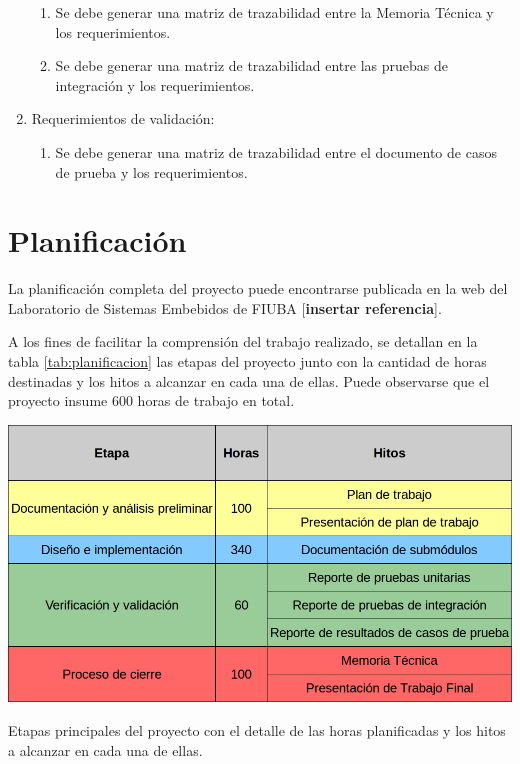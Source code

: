\begin{enumerate}
\begin{enumerate}
		\item Se debe generar una matriz de trazabilidad entre la Memoria Técnica y los requerimientos.
		\item Se debe generar una matriz de trazabilidad entre las pruebas de integración y los requerimientos.
	\end{enumerate}
	\item Requerimientos de validación:
	\begin{enumerate}
	  \item Se debe generar una matriz de trazabilidad entre el documento de casos de prueba y los requerimientos.
  \end{enumerate}
\end{enumerate}


\section{Planificación}
\label{sec:plan}

La planificación completa del proyecto puede encontrarse publicada en la web del Laboratorio de Sistemas Embebidos de FIUBA [\textbf{insertar referencia}].

A los fines de facilitar la comprensión del trabajo realizado, se detallan en la tabla \ref{tab:planificacion} las etapas del proyecto junto con la cantidad de horas destinadas y los hitos a alcanzar en cada una de ellas.  Puede observarse que el proyecto insume 600 horas de trabajo en total.

\begin{table}[h]
	\centering
	\includegraphics[width=\textwidth]{./Figures/planificacion.png}
	\caption[Diagrama \textit{Etapas del proyecto}.]{Etapas principales del proyecto con el detalle de las horas planificadas y los hitos a alcanzar en cada una de ellas.}
	\label{tab:planificacion}
\end{table}

